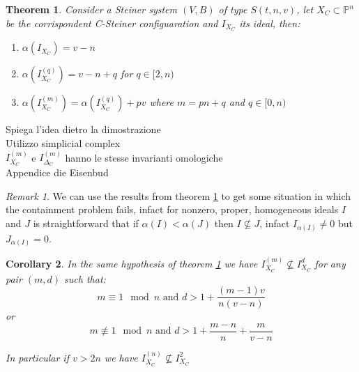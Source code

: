 \documentclass[]{book}
\theoremstyle{plain}
\newtheorem{teo}{Theorem}[section]
\newtheorem{cor}[teo]{Corollary}
\theoremstyle{remark}
\newtheorem{rem}{Remark}
\theoremstyle{definition}
\newcommand{\PP}{\mathbb{P}}
\begin{document}
 \begin{teo} \label{teo:alphaXC}
Consider a Steiner system $ (V,B) $ of type $ S(t,n,v) $, let $ X_C \subset \PP^n$ be the corrispondent C-Steiner configuaration and $ I_{X_C} $ its ideal, then:
\begin{enumerate}
\item $ \alpha(I_{X_C}) = v- n $
\item $ \alpha(I_{X_C}^{(q)}) = v- n +q  $ for $ q \in [2,n) $
\item $ \alpha(I_{X_C}^{(m)}) = \alpha(I_{X_C}^{(q)}) + pv $ where $ m=pn + q $ and $ q \in [0,n) $
\end{enumerate}
 \end{teo}
 
 \begin{tcolorbox}
 Spiega l'idea dietro la dimostrazione\\
 Utilizzo simplicial complex\\
 $ I_{X_C}^{(m)} $ e $ I_{\Delta_C}^{(m)} $ hanno le stesse invarianti omologiche\\
 Appendice die Eisenbud
  \end{tcolorbox}
  
\begin{rem}\label{rem:alphaXC}
We can use the results from theorem \ref{teo:alphaXC} to get some situation in which the containment problem fails, infact for nonzero, proper, homogeneous ideals $ I $ and $ J $ is straightforward that if $ \alpha(I) < \alpha(J) $ then $ I \not\subseteq J $, infact $ I_{ \alpha(I) } \neq 0$ but $ J_{ \alpha(I) } = 0 $. 
\end{rem}

\begin{cor}\label{cor:alphaXC}
In the same hypothesis of theorem \ref{teo:alphaXC} we have $ I_{X_C}^{(m)} \not \subseteq I_{X_C}^d $ for any pair $ (m,d) $ such that:
\begin{equation}\label{eq:cor:alphaXC:1}
	m \equiv 1 \mod n \text{ and } d > 1 + \frac{ (m-1)v }{ n(v-n)}
\end{equation}
or 
\begin{equation}\label{eq:cor:alphaXC:2}
	m \not \equiv 1 \mod n \text{ and } d > 1  + \frac{ m - n }{ n } + \frac{ m }{ v - n }
\end{equation}

 In particular if $ v > 2n $ we have $ I_{X_C}^{(n)} \not \subseteq I_{X_C}^2  $
 \end{cor}
  
\end{document}

